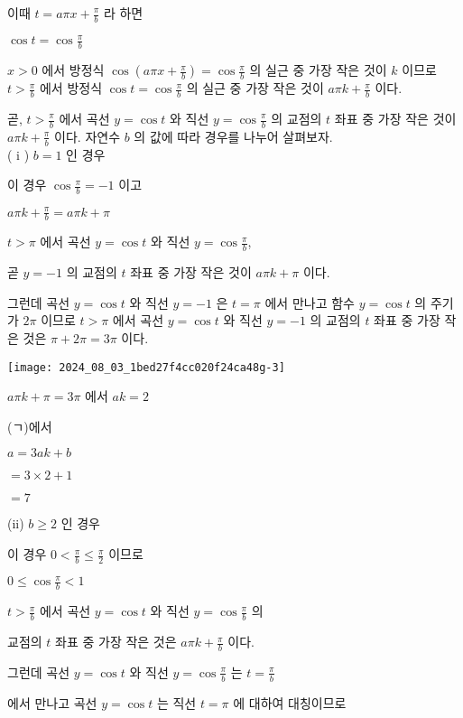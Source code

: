 \documentclass[10pt]{article}
\begin{document}
이때 \(t=a \pi x+\frac{\pi}{b}\) 라 하면

\(\cos t=\cos \frac{\pi}{b}\)

\(x>0\) 에서 방정식 \(\cos \left(a \pi x+\frac{\pi}{b}\right)=\cos \frac{\pi}{b}\) 의 실근 중 가장 작은 것이 \(k\) 이므로 \(t>\frac{\pi}{b}\) 에서 방정식 \(\cos t=\cos \frac{\pi}{b}\) 의 실근 중 가장 작은 것이 \(a \pi k+\frac{\pi}{b}\) 이다.

곧, \(t>\frac{\pi}{b}\) 에서 곡선 \(y=\cos t\) 와 직선 \(y=\cos \frac{\pi}{b}\) 의 교점의 \(t\) 좌표 중 가장 작은 것이 \(a \pi k+\frac{\pi}{b}\) 이다. 자연수 \(b\) 의 값에 따라 경우를 나누어 살펴보자.\\
( i ) \(b=1\) 인 경우

이 경우 \(\cos \frac{\pi}{b}=-1\) 이고

\(a \pi k+\frac{\pi}{b}=a \pi k+\pi\)

\(t>\pi\) 에서 곡선 \(y=\cos t\) 와 직선 \(y=\cos \frac{\pi}{b}\),

곧 \(y=-1\) 의 교점의 \(t\) 좌표 중 가장 작은 것이 \(a \pi k+\pi\) 이다.

그런데 곡선 \(y=\cos t\) 와 직선 \(y=-1\) 은 \(t=\pi\) 에서 만나고 함수 \(y=\cos t\) 의 주기가 \(2 \pi\) 이므로 \(t>\pi\) 에서 곡선 \(y=\cos t\) 와 직선 \(y=-1\) 의 교점의 \(t\) 좌표 중 가장 작은 것은 \(\pi+2 \pi=3 \pi\) 이다.

\begin{center}
\texttt{[image: 2024\_08\_03\_1bed27f4cc020f24ca48g-3]}
\end{center}

\(a \pi k+\pi=3 \pi\) 에서 \(a k=2\)

(ㄱ)에서

\(a=3 a k+b\)

\(=3 \times 2+1\)

\(=7\)

(ii) \(b \geq 2\) 인 경우

이 경우 \(0<\frac{\pi}{b} \leq \frac{\pi}{2}\) 이므로

\(0 \leq \cos \frac{\pi}{b}<1\)

\(t>\frac{\pi}{b}\) 에서 곡선 \(y=\cos t\) 와 직선 \(y=\cos \frac{\pi}{b}\) 의

교점의 \(t\) 좌표 중 가장 작은 것은 \(a \pi k+\frac{\pi}{b}\) 이다.

그런데 곡선 \(y=\cos t\) 와 직선 \(y=\cos \frac{\pi}{b}\) 는 \(t=\frac{\pi}{b}\)

에서 만나고 곡선 \(y=\cos t\) 는 직선 \(t=\pi\) 에 대하여 대칭이므로
\end{document}

